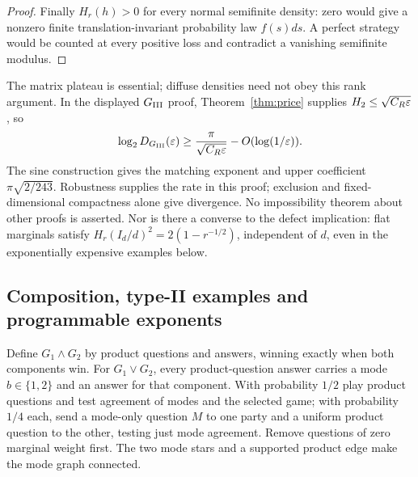 \begin{proof}
Finally $H_r(h)>0$ for every normal semifinite density: zero would give a nonzero finite translation-invariant probability law $f(s)ds$. A perfect strategy would be counted at every positive loss and contradict a vanishing semifinite modulus.
\end{proof}
The matrix plateau is essential; diffuse densities need not obey this rank argument. In the displayed $G_{\mathrm{III}}$ proof, Theorem~\ref{thm:price} supplies $H_2\le\sqrt{C_R\varepsilon}$, so
\[
 \log_2D_{G_{\mathrm{III}}}(\varepsilon)\ge\frac\pi{\sqrt{C_R\varepsilon}}
             -O(\log(1/\varepsilon)).
\]
The sine construction gives the matching exponent and upper coefficient $\pi\sqrt{2/243}$. Robustness supplies the rate in this proof; exclusion and fixed-dimensional compactness alone give divergence. No impossibility theorem about other proofs is asserted. Nor is there a converse to the defect implication: flat marginals satisfy $H_r(I_d/d)^2=2(1-r^{-1/2})$, independent of $d$, even in the exponentially expensive examples below.

\subsection{Composition, type-II examples and programmable exponents}
Define $G_1\wedge G_2$ by product questions and answers, winning exactly when both components win. For $G_1\vee G_2$, every product-question answer carries a mode $b\in\{1,2\}$ and an answer for that component. With probability $1/2$ play product questions and test agreement of modes and the selected game; with probability $1/4$ each, send a mode-only question $M$ to one party and a uniform product question to the other, testing just mode agreement. Remove questions of zero marginal weight first. The two mode stars and a supported product edge make the mode graph connected.

